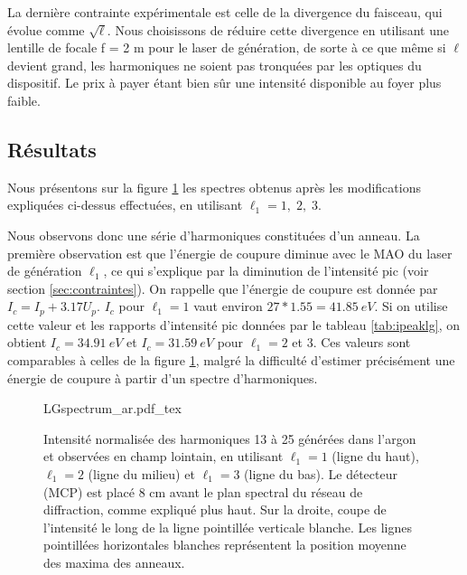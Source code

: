 La dernière contrainte expérimentale est celle de la divergence du faisceau, qui évolue comme $\sqrt{\ell}$. Nous choisissons de réduire cette divergence en utilisant une lentille de focale f = 2 m pour le laser de génération, de sorte à ce que même si $\ell$ devient grand, les harmoniques ne soient pas tronquées par les optiques du dispositif. Le prix à payer étant bien sûr une intensité disponible au foyer plus faible. 

\subsection{Résultats}
\label{sec:results_lg}
Nous présentons sur la figure \ref{Fig:LGSpectrumAr} les spectres obtenus après les modifications expliquées ci-dessus effectuées, en utilisant $\ell_{1} = 1,\;2,\;3$. 

Nous observons donc une série d'harmoniques constituées d'un anneau. La première observation est que l'énergie de coupure diminue avec le MAO du laser de génération $\ell_{1}$, ce qui s'explique par la diminution de l'intensité pic (voir section \ref{sec:contraintes}). On rappelle que l'énergie de coupure est donnée par $I_c = I_p+3.17U_p$. $I_c$ pour $\ell_{1} = 1$ vaut environ $27*1.55=\SI{41.85}{eV}$. Si on utilise cette valeur et les rapports d'intensité pic données par le tableau \ref{tab:ipeaklg}, on obtient $I_c=\SI{34.91}{eV}$ et $I_c=\SI{31.59}{eV}$ pour $\ell_{1} = 2$ et 3. Ces valeurs sont comparables à celles de la figure \ref{Fig:LGSpectrumAr}, malgré la difficulté d'estimer précisément une énergie de coupure à partir d'un spectre d'harmoniques. 

\begin{figure}[!ht]
\centering
\def\svgwidth{1\columnwidth}
{LGspectrum_ar.pdf_tex}
\caption[Intensité normalisée des harmoniques 13 à 25 générées dans l'argon et observées en champ lointain, en utilisant $\ell_{1} = 1$ (ligne du haut), $\ell_{1} = 2$ (ligne du milieu) et $\ell_{1} = 3$ (ligne du bas). Le détecteur (MCP) est placé 8 cm avant le plan spectral du réseau de diffraction, comme expliqué plus haut. Sur la droite, coupe de l'intensité le long de la ligne pointillée verticale blanche. Les lignes pointillées horizontales blanches représentent la position moyenne des maxima des anneaux.]{Intensité normalisée des harmoniques 13 à 25 générées dans l'argon et observées en champ lointain, en utilisant $\ell_{1} = 1$ (ligne du haut), $\ell_{1} = 2$ (ligne du milieu) et $\ell_{1} = 3$ (ligne du bas). Le détecteur (MCP) est placé 8 cm avant le plan spectral du réseau de diffraction, comme expliqué plus haut\footnotemark[1]. Sur la droite, coupe de l'intensité le long de la ligne pointillée verticale blanche. Les lignes pointillées horizontales blanches représentent la position moyenne des maxima des anneaux.}
\label{Fig:LGSpectrumAr}
\end{figure}

